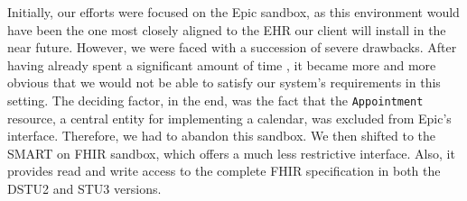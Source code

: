 \documentclass[sigconf]{acmart}
\begin{document}
Initially, our efforts were focused on the Epic sandbox, as this environment would have been the one most closely aligned to the EHR our client will install in the near future. However, we were faced with a succession of severe drawbacks.
% 
After having already spent a significant amount of time %
, it became more and more obvious that we would not be able to satisfy our system's requirements in this setting. The deciding factor, in the end, was the fact that the \texttt{Appointment} resource, a central entity for implementing a calendar, was excluded from Epic's interface. Therefore, we had to abandon this sandbox. %
%
We then shifted to the SMART on FHIR sandbox, %
which offers a much less restrictive interface. %
Also, it provides read and write access to the complete FHIR specification in both the DSTU2 and STU3 versions.
\end{document}
